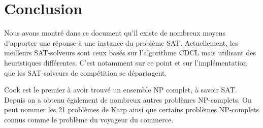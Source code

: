 \documentclass[12pt]{extarticle}
\begin{document}
\newpage

\section*{Conclusion}

Nous avons montré dans ce document qu'il existe de nombreux moyens d'apporter une réponse à une instance du problème SAT.
Actuellement, les meilleurs SAT-solveurs sont ceux basés sur l'algorithme CDCL mais utilisant des heuristiques différentes.
C'est notamment sur ce point et sur l'implémentation que les SAT-solveurs de compétition se départagent.

Cook est le premier à avoir trouvé un ensemble NP complet, à savoir SAT. Depuis on a obtenu également de nombreux autres problèmes NP-complets.
On peut nommer les 21 problèmes de Karp ainsi que certains problèmes NP-complets connus comme le problème du voyageur du commerce.

\nocite{*}



\end{document}

